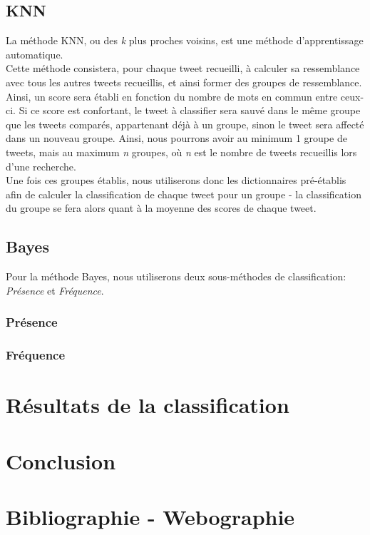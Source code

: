\documentclass[pdftex,12pt,a4paper]{report}
\begin{document}
\begin{spacing}{1.2}
\section{KNN}

La méthode KNN, ou des \textit{k} plus proches voisins, est une méthode d'apprentissage automatique.\\
Cette méthode consistera, pour chaque tweet recueilli, à calculer sa ressemblance avec tous les autres tweets recueillis, et ainsi former des groupes de ressemblance. Ainsi, un score sera établi en fonction du nombre de mots en commun entre ceux-ci. Si ce score est confortant, le tweet à classifier sera sauvé dans le même groupe que les tweets comparés, appartenant déjà à un groupe, sinon le tweet sera affecté dans un nouveau groupe. Ainsi, nous pourrons avoir au minimum 1 groupe de tweets, mais au maximum \textit{n} groupes, où \textit{n} est le nombre de tweets recueillis lors d'une recherche.\\
Une fois ces groupes établis, nous utiliserons donc les dictionnaires pré-établis afin de calculer la classification de chaque tweet pour un groupe - la classification du groupe se fera alors quant à la moyenne des scores de chaque tweet.

\section{Bayes}

Pour la méthode Bayes, nous utiliserons deux sous-méthodes de classification: \textit{Présence} et \textit{Fréquence}.

\subsection{Présence}

\subsection{Fréquence}

\chapter{Résultats de la classification}

\chapter{Conclusion}

\chapter*{Bibliographie - Webographie}

\end{spacing}
\end{document}
